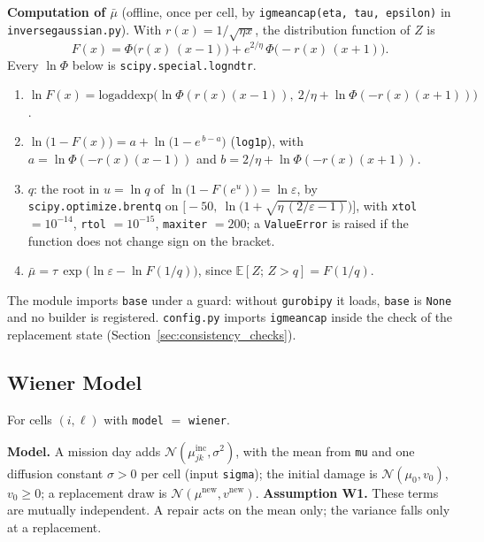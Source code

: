 \documentclass[11pt,a4paper]{article}
\theoremstyle{plain}
\theoremstyle{definition}
\newcommand{\inc}{\mathrm{inc}}
\newcommand{\new}{\mathrm{new}}
\renewcommand{\_}{\textunderscore\allowbreak{}}
\begin{document}
\textbf{Computation of $\bar\mu$} (offline, once per cell, by
\texttt{ig\_mean\_cap(eta, tau, epsilon)} in \texttt{inverse\_gaussian.py}). With
$r(x) = 1/\sqrt{\eta x}$, the distribution function of $Z$ is
\[
  F(x) = \Phi\bigl(r(x)\,(x - 1)\bigr) + e^{2/\eta}\,\Phi\bigl(-r(x)\,(x + 1)\bigr).
\]
Every $\ln\Phi$ below is \texttt{scipy.special.log\_ndtr}.
\begin{enumerate}[leftmargin=1.5em, nosep]
  \item $\ln F(x) = \mathrm{logaddexp}\bigl(\ln\Phi(r(x)(x-1)),\ 2/\eta + \ln\Phi(-r(x)(x+1))\bigr)$.
  \item $\ln\bigl(1 - F(x)\bigr) = a + \ln\bigl(1 - e^{\,b-a}\bigr)$ (\texttt{log1p}), with
        $a = \ln\Phi(-r(x)(x-1))$ and $b = 2/\eta + \ln\Phi(-r(x)(x+1))$.
  \item $q$: the root in $u = \ln q$ of $\ln\bigl(1 - F(e^u)\bigr) = \ln\varepsilon$, by
        \texttt{scipy.optimize.brentq} on $\bigl[-50,\ \ln\bigl(1 + \sqrt{\eta\,(2/\varepsilon - 1)}\bigr)\bigr]$,
        with \texttt{xtol} $= 10^{-14}$, \texttt{rtol} $= 10^{-15}$, \texttt{maxiter} $= 200$; a
        \texttt{ValueError} is raised if the function does not change sign on the bracket.
  \item $\bar\mu = \tau\,\exp\bigl(\ln\varepsilon - \ln F(1/q)\bigr)$, since $\mathbb{E}[Z;\, Z > q] = F(1/q)$.
\end{enumerate}
The module imports \texttt{base} under a guard: without \texttt{gurobipy} it loads, \texttt{base} is
\texttt{None} and no builder is registered. \texttt{config.py} imports \texttt{ig\_mean\_cap} inside the check
of the replacement state (Section~\ref{sec:consistency_checks}).

\subsection{Wiener Model}
\label{sec:dyn_wiener}

For cells $(i,\ell)$ with \texttt{model} $=$ \texttt{wiener}.

\textbf{Model.} A mission day adds $\mathcal{N}(\mu^{\inc}_{jk}, \sigma^2)$, with
the mean from \texttt{mu} and one diffusion constant $\sigma > 0$ per cell (input
\texttt{sigma}); the initial damage is $\mathcal{N}(\mu_0, v_0)$, $v_0 \geq 0$; a
replacement draw is $\mathcal{N}(\mu^{\new}, v^{\new})$. \textbf{Assumption W1.} These
terms are mutually independent. A repair acts on the mean only; the variance falls
only at a replacement.
\end{document}
